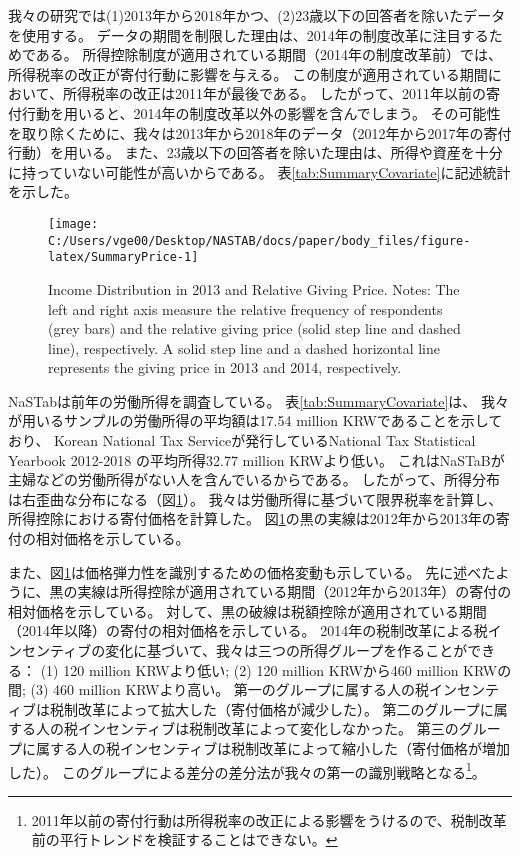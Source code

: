 \documentclass[
  11pt,
  a4paper,
]{article}
\begin{document}
我々の研究では(1)2013年から2018年かつ、(2)23歳以下の回答者を除いたデータを使用する。
データの期間を制限した理由は、2014年の制度改革に注目するためである。
所得控除制度が適用されている期間（2014年の制度改革前）では、所得税率の改正が寄付行動に影響を与える。
この制度が適用されている期間において、所得税率の改正は2011年が最後である。
したがって、2011年以前の寄付行動を用いると、2014年の制度改革以外の影響を含んでしまう。
その可能性を取り除くために、我々は2013年から2018年のデータ（2012年から2017年の寄付行動）を用いる。
また、23歳以下の回答者を除いた理由は、所得や資産を十分に持っていない可能性が高いからである。
表\ref{tab:SummaryCovariate}に記述統計を示した。

\begin{figure}[t]

{\centering \texttt{[image: C:/Users/vge00/Desktop/NASTAB/docs/paper/body\_files/figure-latex/SummaryPrice-1]} 

}

\caption{Income Distribution in 2013 and Relative Giving Price. Notes: The left and right axis measure the relative frequency of respondents (grey bars) and the relative giving price (solid step line and dashed line), respectively. A solid step line and a dashed horizontal line represents the giving price in 2013 and 2014, respectively.}\label{fig:SummaryPrice}
\end{figure}

NaSTabは前年の労働所得を調査している。
表\ref{tab:SummaryCovariate}は、
我々が用いるサンプルの労働所得の平均額は17.54 million KRWであることを示しており、
Korean National Tax Serviceが発行しているNational Tax Statistical Yearbook 2012-2018
の平均所得32.77 million KRWより低い。
これはNaSTaBが主婦などの労働所得がない人を含んでいるからである。
したがって、所得分布は右歪曲な分布になる（図\ref{fig:SummaryPrice}）。
我々は労働所得に基づいて限界税率を計算し、所得控除における寄付価格を計算した。
図\ref{fig:SummaryPrice}の黒の実線は2012年から2013年の寄付の相対価格を示している。

また、図\ref{fig:SummaryPrice}は価格弾力性を識別するための価格変動も示している。
先に述べたように、黒の実線は所得控除が適用されている期間（2012年から2013年）の寄付の相対価格を示している。
対して、黒の破線は税額控除が適用されている期間（2014年以降）の寄付の相対価格を示している。
2014年の税制改革による税インセンティブの変化に基づいて、我々は三つの所得グループを作ることができる：
(1) 120 million KRWより低い;
(2) 120 million KRWから460 million KRWの間;
(3) 460 million KRWより高い。
第一のグループに属する人の税インセンティブは税制改革によって拡大した（寄付価格が減少した）。
第二のグループに属する人の税インセンティブは税制改革によって変化しなかった。
第三のグループに属する人の税インセンティブは税制改革によって縮小した（寄付価格が増加した）。
このグループによる差分の差分法が我々の第一の識別戦略となる\footnote{2011年以前の寄付行動は所得税率の改正による影響をうけるので、税制改革前の平行トレンドを検証することはできない。}。
\end{document}
